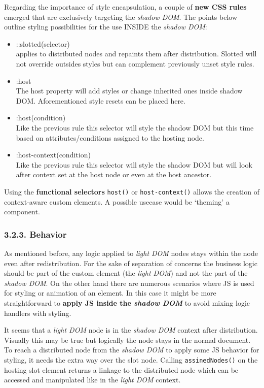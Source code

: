 \documentclass[]{article}
\providecommand{\tightlist}{%
  \setlength{\itemsep}{0pt}\setlength{\parskip}{0pt}}
\begin{document}
Regarding the importance of style encapsulation, a couple of \textbf{new
CSS rules} emerged that are exclusively targeting the \emph{shadow DOM}.
The points below outline styling possibilities for the use INSIDE the
\emph{shadow DOM}:

\begin{itemize}
\tightlist
\item
  ::slotted(selector)\\
  applies to distributed nodes and repaints them after distribution.
  Slotted will not override outsides styles but can complement
  previously unset style rules.
\item
  :host\\
  The host property will add styles or change inherited ones inside
  shadow DOM. Aforementioned style resets can be placed here.
\item
  :host(condition)\\
  Like the previous rule this selector will style the shadow DOM but
  this time based on attributes/conditions assigned to the hosting node.
\item
  :host-context(condition)\\
  Like the previous rule this selector will style the shadow DOM but
  will look after context set at the host node or even at the host
  ancestor.
\end{itemize}

Using the \textbf{functional selectors} \texttt{host()} or
\texttt{host-context()} allows the creation of context-aware custom
elements. A possible usecase would be `theming' a component.

\subsubsection{3.2.3. Behavior}\label{behavior}

As mentioned before, any logic applied to \emph{light DOM} nodes stays
within the node even after redistribution. For the sake of separation of
concerns the business logic should be part of the custom element (the
\emph{light DOM}) and not the part of the \emph{shadow DOM}. On the
other hand there are numerous scenarios where JS is used for styling or
animation of an element. In this case it might be more straightforward
to \textbf{apply JS inside the \emph{shadow DOM}} to avoid mixing logic
handlers with styling.

It seems that a \emph{light DOM} node is in the \emph{shadow DOM}
context after distribution. Visually this may be true but logically the
node stays in the normal document. To reach a distributed node from the
\emph{shadow DOM} to apply some JS behavior for styling, it needs the
extra way over the slot node. Calling \texttt{assinedNodes()} on the
hosting slot element returns a linkage to the distributed node which can
be accessed and manipulated like in the \emph{light DOM} context.
\end{document}
